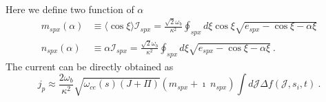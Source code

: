 Here we define two function of $\alpha$
\begin{equation}
    \begin{aligned}
        m_{spx}(\alpha) & \equiv \langle \cos \xi \rangle  \mathcal{I}_{spx} = \frac{\sqrt{2} \omega_b}{\kappa^2} \oint_{s p x} d \xi \cos \xi \sqrt{e_{s p x}-\cos \xi-\alpha \xi} \\
        n_{spx}(\alpha) & \equiv \alpha \mathcal{I}_{spx} = \frac{\sqrt{2} \omega_b}{\kappa^2} \oint_{s p x} d \xi \sqrt{e_{s p x}-\cos \xi-\alpha \xi} ~.
    \end{aligned}
\end{equation}
The current can be directly obtained as 
\begin{equation}\label{eq.adi_J}
    j_p \approx \frac{2 \omega_b}{\kappa^2} \sqrt{\omega_{c e}(s)(J+\Pi)}\left(m_{s p x}+\imath ~ n_{s p x}\right) \int d \mathcal{J} \Delta f(\mathcal{J},s_i,t) ~.
\end{equation}

